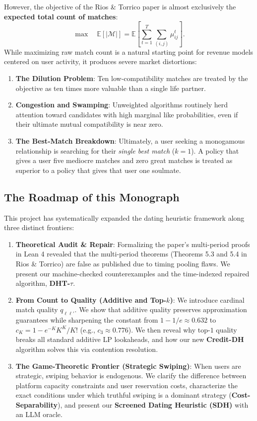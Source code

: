 \documentclass[11pt,letterpaper]{article}
\theoremstyle{definition}
\theoremstyle{plain}
\theoremstyle{remark}
\begin{document}
However, the objective of the Rios \& Torrico paper is almost exclusively the \textbf{expected total count of matches}:
\begin{equation}
    \max \quad \mathbb{E} \left[ |\mathcal{M}| \right] = \mathbb{E}\left[ \sum_{t=1}^T \sum_{(i,j)} \mu_{ij}^t \right].
\end{equation}
While maximizing raw match count is a natural starting point for revenue models centered on user activity, it produces severe market distortions:
\begin{enumerate}[leftmargin=2em]
    \item \textbf{The Dilution Problem}: Ten low-compatibility matches are treated by the objective as ten times more valuable than a single life partner.
    \item \textbf{Congestion and Swamping}: Unweighted algorithms routinely herd attention toward candidates with high marginal like probabilities, even if their ultimate mutual compatibility is near zero.
    \item \textbf{The Best-Match Breakdown}: Ultimately, a user seeking a monogamous relationship is searching for their \emph{single best match} ($k=1$). A policy that gives a user five mediocre matches and zero great matches is treated as superior to a policy that gives that user one soulmate.
\end{enumerate}

\subsection{The Roadmap of this Monograph}
This project has systematically expanded the dating heuristic framework along three distinct frontiers:
\begin{enumerate}[leftmargin=2em]
    \item \textbf{Theoretical Audit \& Repair}: Formalizing the paper's multi-period proofs in Lean 4 revealed that the multi-period theorems (Theorems 5.3 and 5.4 in Rios \& Torrico) are false as published due to timing pooling flaws. We present our machine-checked counterexamples and the time-indexed repaired algorithm, \textbf{DHT-$\tau$}.
    \item \textbf{From Count to Quality (Additive and Top-$k$)}: We introduce cardinal match quality $q_{\ell\ell'}$. We show that additive quality preserves approximation guarantees while sharpening the constant from $1-1/e \approx 0.632$ to $c_K = 1 - e^{-K}K^K/K!$ (e.g., $c_3 \approx 0.776$). We then reveal why top-$1$ quality breaks all standard additive LP lookaheads, and how our new \textbf{Credit-DH} algorithm solves this via contention resolution.
    \item \textbf{The Game-Theoretic Frontier (Strategic Swiping)}: When users are strategic, swiping behavior is endogenous. We clarify the difference between platform capacity constraints and user reservation costs, characterize the exact conditions under which truthful swiping is a dominant strategy (\textbf{Cost-Separability}), and present our \textbf{Screened Dating Heuristic (SDH)} with an LLM oracle.
\end{enumerate}
\end{document}
